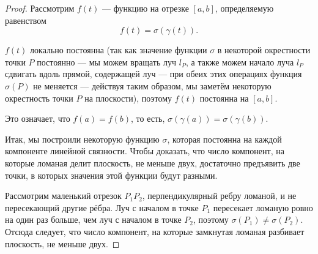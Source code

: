 \begin{proof}
    Рассмотрим $f(t)$ — функцию на отрезке $[a,b]$, определяемую равенством 
    \[f(t) = \sigma(\gamma(t)).\]

    $f(t)$ локально постоянна (так как значение функции $\sigma$ в некоторой окрестности точки $P$ постоянно — мы можем вращать луч $l_P$, а также можем начало луча $l_P$ сдвигать вдоль прямой, содержащей луч — при обеих этих операциях функция $\sigma(P)$ не меняется — действуя таким образом, мы заметём некоторую окрестность точки $P$ на плоскости), поэтому $f(t)$ постоянна на $[a,b]$.

    Это означает, что $f(a) = f(b)$, то есть, $\sigma(\gamma(a)) = \sigma(\gamma(b))$.


    Итак, мы построили некоторую функцию $\sigma$, которая постоянна на каждой компоненте линейной связности. Чтобы доказать, что число компонент, на которые ломаная делит плоскость, не меньше двух, достаточно предъявить две точки, в которых значения этой функции будут разными.

    Рассмотрим маленький отрезок $P_1 P_2$, перпендикулярный ребру ломаной, и не пересекающий другие рёбра. Луч с началом в точке $P_1$ пересекает ломаную ровно на один раз больше, чем луч с началом в точке $P_2$, поэтому $\sigma(P_1) \neq \sigma(P_2)$. Отсюда следует, что число компонент, на которые замкнутая ломаная разбивает плоскость, не меньше двух.
\end{proof}
